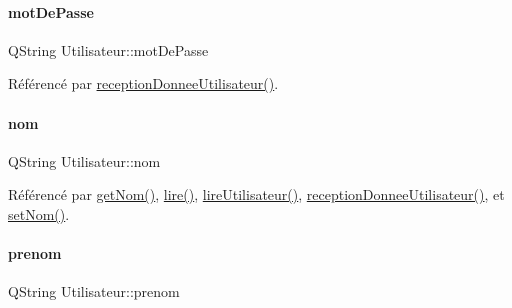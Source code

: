 \mbox{\label{class_utilisateur_a4f6a17d0fb5c231bcb414396236a056f}} 
\paragraph{\texorpdfstring{mot\+De\+Passe}{motDePasse}}
{\footnotesize\ttfamily Q\+String Utilisateur\+::mot\+De\+Passe\hspace{0.3cm}{\ttfamily [private]}}



Référencé par \hyperlink{class_utilisateur_a81311d8a9f62ffdfb8ee65d37461ea17}{reception\+Donnee\+Utilisateur()}.

\mbox{\label{class_utilisateur_a1096e809aca4b7cf453a7af93cb72502}} 
\paragraph{\texorpdfstring{nom}{nom}}
{\footnotesize\ttfamily Q\+String Utilisateur\+::nom\hspace{0.3cm}{\ttfamily [private]}}



Référencé par \hyperlink{class_utilisateur_adfffec2519ba338497de55b61e7bc420}{get\+Nom()}, \hyperlink{class_utilisateur_aa7d1a92ff4e06e9d302369f6c48884e1}{lire()}, \hyperlink{class_utilisateur_a5911f84daf6d47d7f50e6d16022b292e}{lire\+Utilisateur()}, \hyperlink{class_utilisateur_a81311d8a9f62ffdfb8ee65d37461ea17}{reception\+Donnee\+Utilisateur()}, et \hyperlink{class_utilisateur_aec15176f18c3ae77a04214dd35e917db}{set\+Nom()}.

\mbox{\label{class_utilisateur_a1dd0779807b19298f30f39d9c371170f}} 
\paragraph{\texorpdfstring{prenom}{prenom}}
{\footnotesize\ttfamily Q\+String Utilisateur\+::prenom\hspace{0.3cm}{\ttfamily [private]}}



